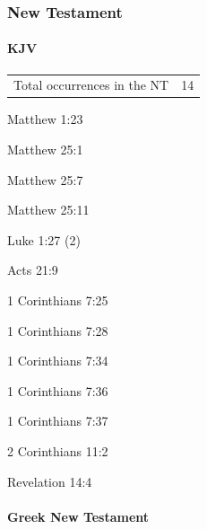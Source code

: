 	\subsubsection{New Testament} %
		\label{VIRGIN-NT}
	
		\paragraph{KJV}
			\label{VIRGIN-NT-KJV}
			
	
			\begin{tabular}{ll}
				Total occurrences in the NT & 14
			\end{tabular}
			
			\begin{compactdesc}
				\item[Matthew 1:23]
				\item[Matthew 25:1] 
				\item[Matthew 25:7] 
				\item[Matthew 25:11] 
				\item[Luke 1:27] (2)
				\item[Acts 21:9]
				\item[1 Corinthians 7:25]
				\item[1 Corinthians 7:28]
				\item[1 Corinthians 7:34]
				\item[1 Corinthians 7:36]
				\item[1 Corinthians 7:37]
				\item[2 Corinthians 11:2]
				\item[Revelation 14:4]
			\end{compactdesc}
			
		\paragraph{Greek New Testament} %
			\label{VIRGIN-GREEK}
		
			\subparagraph{\texorpdfstring{}{}}
				\label{PARTHENOS}
			
